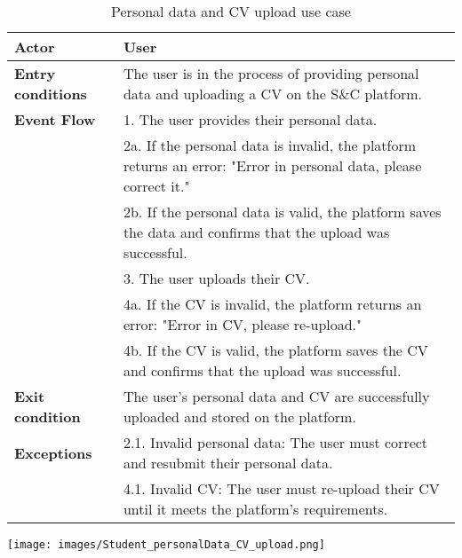 \begin{table}[h!]
    \centering
    \begin{tabular}{lp{10cm}}
        \textbf{Actor} & User \\ \hline
        \textbf{Entry conditions} & The user is in the process of providing personal data and uploading a CV on the S\&C platform. \\ \hline
        \textbf{Event Flow} & 
        1. The user provides their personal data. \\
        & 2a. If the personal data is invalid, the platform returns an error: "Error in personal data, please correct it." \\
        & 2b. If the personal data is valid, the platform saves the data and confirms that the upload was successful. \\
        & 3. The user uploads their CV. \\
        & 4a. If the CV is invalid, the platform returns an error: "Error in CV, please re-upload." \\
        & 4b. If the CV is valid, the platform saves the CV and confirms that the upload was successful. \\
        \hline
        \textbf{Exit condition} & The user's personal data and CV are successfully uploaded and stored on the platform. \\ \hline
        \textbf{Exceptions} & 
        2.1. Invalid personal data: The user must correct and resubmit their personal data. \\
        & 4.1. Invalid CV: The user must re-upload their CV until it meets the platform's requirements. \\
    \end{tabular}
    \caption{Personal data and CV upload use case}
    \label{tab:personal_data_cv_upload}
\end{table}


\begin{center}
    \texttt{[image: images/Student\_personalData\_CV\_upload.png]}
\end{center}

